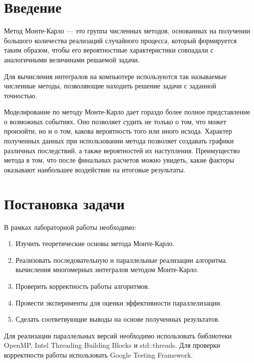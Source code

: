 \documentclass{report}
\begin{document}
\setcounter{page}{2}

\tableofcontents
\newpage

\section*{Введение}
Метод Монте-Карло — это группа численных методов, основанных на
получении большого количества реализаций случайного процесса, который
формируется таким образом, чтобы его вероятностные характеристики
совпадали с аналогичными величинами решаемой задачи.
\par Для вычисления интегралов на компьютере используются так называемые численные методы, позволяющие находить решение задачи с заданной точностью.
\par Моделирование по методу Монте-Карло дает гораздо более полное
представление о возможных событиях. Оно позволяет судить не только о том,
что может произойти, но и о том, какова вероятность того или иного исхода.
Характер полученных данных при использовании метода позволяет создавать
графики различных последствий, а также вероятностей их наступления.
Преимущество метода в том, что после финальных расчетов можно
увидеть, какие факторы оказывают наибольшее воздействие на итоговые
результаты.

\newpage

\section*{Постановка задачи}
В рамках лабораторной работы необходимо:
\begin{enumerate}
\item Изучить теоретические основы метода Монте-Карло.
\item Реализовать последовательную и параллельные реализации алгоритма. вычисления многомерных интегралов методом Монте-Карло.
\item Проверить корректность работы алгоритмов.
\item Провести эксперименты для оценки эффективности параллелизации.
\item Сделать соответвующие выводы на основе полученных результатов.
\end{enumerate}
\par Для реализации параллельных версий необходимо использовать библиотеки OpenMP, Intel Threading Building Blocks и std::threads. Для проверки корректности работы использовать Google Testing Framework.
\newpage
\end{document}
